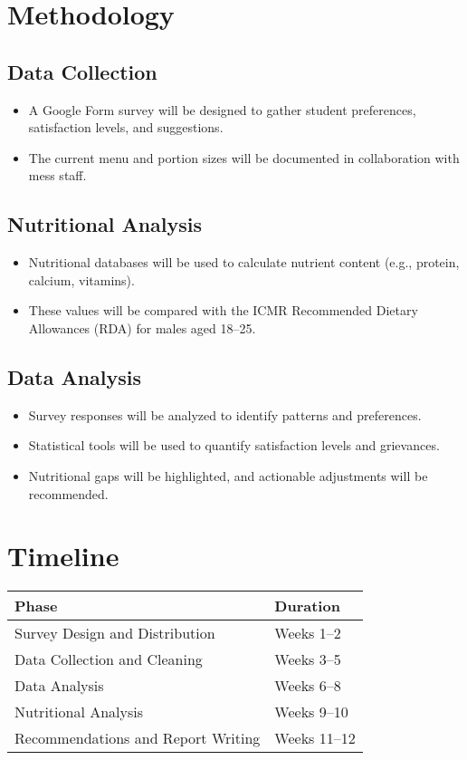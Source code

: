 \documentclass[12pt,a4paper]{article}
\begin{document}
\section*{Methodology}
\subsection*{Data Collection}
\begin{itemize}
    \item A Google Form survey will be designed to gather student preferences, satisfaction levels, and suggestions.
    \item The current menu and portion sizes will be documented in collaboration with mess staff.
\end{itemize}

\subsection*{Nutritional Analysis}
\begin{itemize}
    \item Nutritional databases will be used to calculate nutrient content (e.g., protein, calcium, vitamins).
    \item These values will be compared with the ICMR Recommended Dietary Allowances (RDA) for males aged 18--25.
\end{itemize}

\subsection*{Data Analysis}
\begin{itemize}
    \item Survey responses will be analyzed to identify patterns and preferences.
    \item Statistical tools will be used to quantify satisfaction levels and grievances.
    \item Nutritional gaps will be highlighted, and actionable adjustments will be recommended.
\end{itemize}

\section*{Timeline}
\begin{tabular}{|l|l|}
\hline
\textbf{Phase} & \textbf{Duration} \\
\hline
Survey Design and Distribution & Weeks 1--2 \\
Data Collection and Cleaning & Weeks 3--5 \\
Data Analysis & Weeks 6--8 \\
Nutritional Analysis & Weeks 9--10 \\
Recommendations and Report Writing & Weeks 11--12 \\
\hline
\end{tabular}
\end{document}
